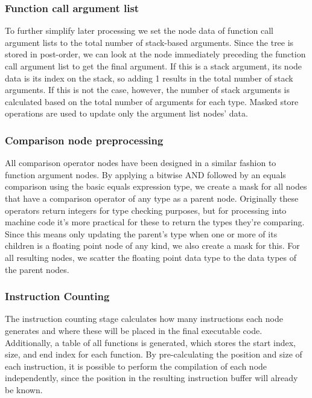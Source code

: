 \documentclass[12pt,dvipsnames]{article}
\begin{document}
\subsubsection*{Function call argument list}
To further simplify later processing we set the node data of function call argument lists to the total number of stack-based arguments. Since the tree is stored in post-order, we can look at the node immediately preceding the function call argument list to get the final argument. If this is a stack argument, its node data is its index on the stack, so adding 1 results in the total number of stack arguments. If this is not the case, however, the number of stack arguments is calculated based on the total number of arguments for each type. Masked store operations are used to update only the argument list nodes' data.

\subsubsection*{Comparison node preprocessing}
All comparison operator nodes have been designed in a similar fashion to function argument nodes. By applying a bitwise AND followed by an equals comparison using the basic equals expression type, we create a mask for all nodes that have a comparison operator of any type as a parent node. Originally these operators return integers for type checking purposes, but for processing into machine code it's more practical for these to return the types they're comparing. Since this means only updating the parent's type when one or more of its children is a floating point node of any kind, we also create a mask for this. For all resulting nodes, we scatter the floating point data type to the data types of the parent nodes.

\subsubsection{Instruction Counting}
The instruction counting stage calculates how many instructions each node generates and where these will be placed in the final executable code. Additionally, a table of all functions is generated, which stores the start index, size, and end index for each function. By pre-calculating the position and size of each instruction, it is possible to perform the compilation of each node independently, since the position in the resulting instruction buffer will already be known.
\end{document}
